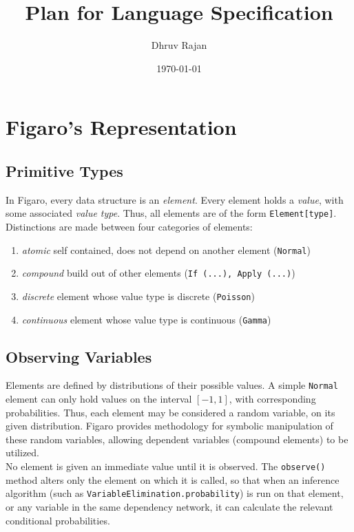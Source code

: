 \documentclass[12pt]{article}
\newcommand{\s}[1]{\texttt{#1}}
\renewcommand{\it}[1]{\textit{#1}}
\begin{document}
\title{Plan for Language Specification}
\author{Dhruv Rajan}
\date{\today}
\maketitle

\section{Figaro's Representation}
\subsection{Primitive Types}
In Figaro, every data structure is an \it{element}. Every element
holds a \textit{value}, with some associated \textit{value type}. Thus, all
elements are of the form \s{Element[type]}. Distinctions are made between four categories of elements:

\begin{enumerate}
\item \it{atomic} self contained, does not depend on another element (\s{Normal})
\item \it{compound} build out of other elements (\s{If (...), Apply (...)})
\item \it{discrete} element whose value type is discrete (\s{Poisson})
\item \it{continuous} element whose value type is continuous (\s{Gamma})
\end{enumerate}

\subsection{Observing Variables}
Elements are defined by distributions of their possible values. A
simple \s{Normal} element can only hold values on the interval
$[-1, 1]$, with corresponding probabilities. Thus, each element may be
considered a random variable, on its given distribution. Figaro
provides methodology for symbolic manipulation of these random
variables, allowing dependent variables (compound elements) to be
utilized. \\

No element is given an immediate value until it is observed. The
\s{observe()} method alters only the element on which it is called, so
that when an inference algorithm (such as
\s{VariableElimination.probability}) is run on that element, or any
variable in the same dependency network, it can calculate
the relevant conditional probabilities.
\end{document}
